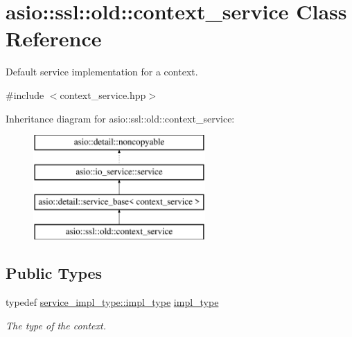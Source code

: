 \hypertarget{classasio_1_1ssl_1_1old_1_1context__service}{}\section{asio\+:\+:ssl\+:\+:old\+:\+:context\+\_\+service Class Reference}
\label{classasio_1_1ssl_1_1old_1_1context__service}


Default service implementation for a context.  




{\ttfamily \#include $<$context\+\_\+service.\+hpp$>$}

Inheritance diagram for asio\+:\+:ssl\+:\+:old\+:\+:context\+\_\+service\+:\begin{figure}[H]
\begin{center}
\leavevmode
\includegraphics[height=4.000000cm]{classasio_1_1ssl_1_1old_1_1context__service}
\end{center}
\end{figure}
\subsection*{Public Types}
\begin{DoxyCompactItemize}
\item 
typedef \hyperlink{classasio_1_1ssl_1_1old_1_1detail_1_1openssl__context__service_a1287914e0f48a9098c9141ca33ecd570}{service\+\_\+impl\+\_\+type\+::impl\+\_\+type} \hyperlink{classasio_1_1ssl_1_1old_1_1context__service_aa082808edcf9f9da07eaf4077d1d8de0}{impl\+\_\+type}
\begin{DoxyCompactList}\small\item\em The type of the context. \end{DoxyCompactList}\end{DoxyCompactItemize}
